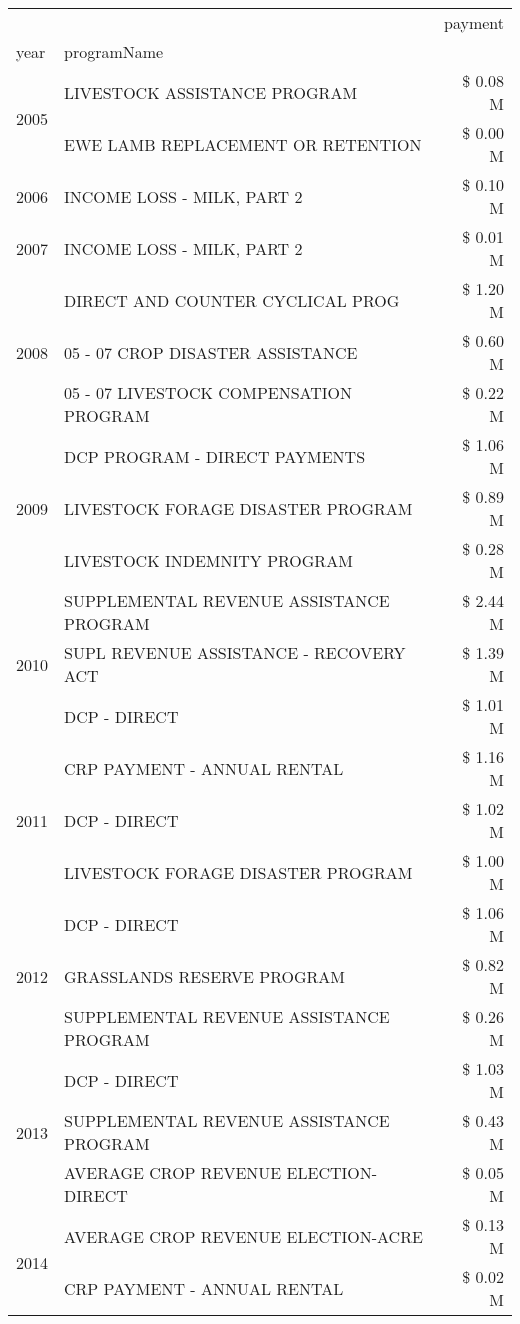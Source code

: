 \begin{tabular}{llr}
\toprule
 &  & payment \\
year & programName &  \\
\midrule
\multirow[t]{2}{*}{2005} & LIVESTOCK ASSISTANCE PROGRAM & \$ 0.08 M \\
 & EWE LAMB REPLACEMENT OR RETENTION & \$ 0.00 M \\
\cline{1-3}
2006 & INCOME LOSS - MILK, PART 2 & \$ 0.10 M \\
\cline{1-3}
2007 & INCOME LOSS - MILK, PART 2 & \$ 0.01 M \\
\cline{1-3}
\multirow[t]{3}{*}{2008} & DIRECT AND COUNTER CYCLICAL PROG & \$ 1.20 M \\
 & 05 - 07 CROP DISASTER ASSISTANCE & \$ 0.60 M \\
 & 05 - 07 LIVESTOCK COMPENSATION PROGRAM & \$ 0.22 M \\
\cline{1-3}
\multirow[t]{3}{*}{2009} & DCP PROGRAM - DIRECT PAYMENTS & \$ 1.06 M \\
 & LIVESTOCK FORAGE DISASTER  PROGRAM & \$ 0.89 M \\
 & LIVESTOCK INDEMNITY PROGRAM & \$ 0.28 M \\
\cline{1-3}
\multirow[t]{3}{*}{2010} & SUPPLEMENTAL REVENUE ASSISTANCE PROGRAM & \$ 2.44 M \\
 & SUPL REVENUE ASSISTANCE - RECOVERY ACT & \$ 1.39 M \\
 & DCP - DIRECT & \$ 1.01 M \\
\cline{1-3}
\multirow[t]{3}{*}{2011} & CRP PAYMENT - ANNUAL RENTAL & \$ 1.16 M \\
 & DCP - DIRECT & \$ 1.02 M \\
 & LIVESTOCK FORAGE DISASTER PROGRAM & \$ 1.00 M \\
\cline{1-3}
\multirow[t]{3}{*}{2012} & DCP - DIRECT & \$ 1.06 M \\
 & GRASSLANDS RESERVE PROGRAM & \$ 0.82 M \\
 & SUPPLEMENTAL REVENUE ASSISTANCE PROGRAM & \$ 0.26 M \\
\cline{1-3}
\multirow[t]{3}{*}{2013} & DCP - DIRECT & \$ 1.03 M \\
 & SUPPLEMENTAL REVENUE ASSISTANCE PROGRAM & \$ 0.43 M \\
 & AVERAGE CROP REVENUE ELECTION-DIRECT & \$ 0.05 M \\
\cline{1-3}
\multirow[t]{3}{*}{2014} & AVERAGE CROP REVENUE ELECTION-ACRE & \$ 0.13 M \\
 & CRP PAYMENT - ANNUAL RENTAL & \$ 0.02 M \\

\end{tabular}
